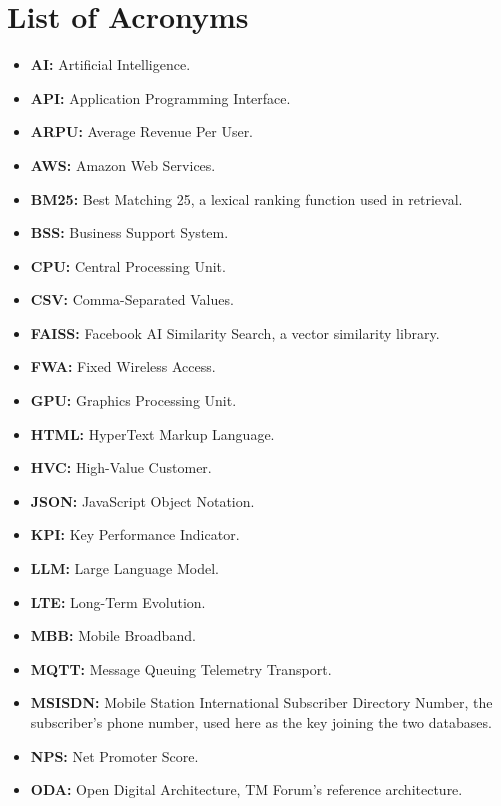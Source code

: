 \chapter*{List of Acronyms}


\vspace{1cm}
\begin{itemize}
    \item \textbf{AI:} Artificial Intelligence.
    \item \textbf{API:} Application Programming Interface.
    \item \textbf{ARPU:} Average Revenue Per User.
    \item \textbf{AWS:} Amazon Web Services.
    \item \textbf{BM25:} Best Matching 25, a lexical ranking function used in retrieval.
    \item \textbf{BSS:} Business Support System.
    \item \textbf{CPU:} Central Processing Unit.
    \item \textbf{CSV:} Comma-Separated Values.
    \item \textbf{FAISS:} Facebook AI Similarity Search, a vector similarity library.
    \item \textbf{FWA:} Fixed Wireless Access.
    \item \textbf{GPU:} Graphics Processing Unit.
    \item \textbf{HTML:} HyperText Markup Language.
    \item \textbf{HVC:} High-Value Customer.
    \item \textbf{JSON:} JavaScript Object Notation.
    \item \textbf{KPI:} Key Performance Indicator.
    \item \textbf{LLM:} Large Language Model.
    \item \textbf{LTE:} Long-Term Evolution.
    \item \textbf{MBB:} Mobile Broadband.
    \item \textbf{MQTT:} Message Queuing Telemetry Transport.
    \item \textbf{MSISDN:} Mobile Station International Subscriber Directory Number, the
    subscriber's phone number, used here as the key joining the two databases.
    \item \textbf{NPS:} Net Promoter Score.
    \item \textbf{ODA:} Open Digital Architecture, TM Forum's reference architecture.

\end{itemize}
